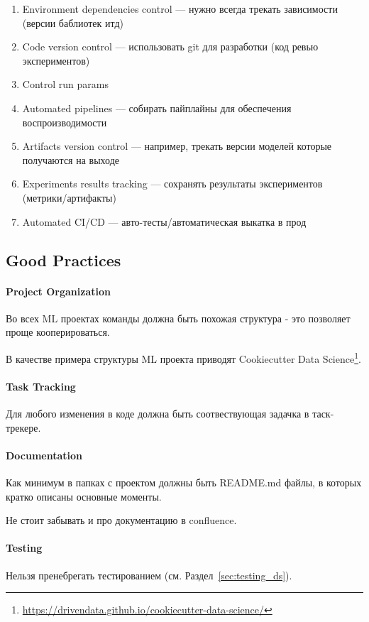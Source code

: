 \begin{enumerate}
    \item Environment dependencies control --- нужно всегда трекать зависимости (версии баблиотек итд)
    \item Code version control --- использовать git для разработки (код ревью экспериментов)
    \item Control run params
    \item Automated pipelines --- собирать пайплайны для обеспечения воспроизводимости
    \item Artifacts version control --- например, трекать версии моделей которые получаются на выходе
    \item Experiments results tracking --- сохранять результаты экспериментов (метрики/артифакты)
    \item Automated CI/CD --- авто-тесты/автоматическая выкатка в прод
\end{enumerate}

\subsection{Good Practices}

\paragraph{Project Organization} Во всех ML проектах команды должна быть похожая структура - это позволяет проще кооперироваться.

В качестве примера структуры ML проекта приводят Cookiecutter Data Science\footnote{\url{https://drivendata.github.io/cookiecutter-data-science/}}.

\paragraph{Task Tracking} Для любого изменения в коде должна быть соотвествующая задачка в таск-трекере.

\paragraph{Documentation} Как минимум в папках с проектом должны быть README.md файлы, в которых кратко описаны основные моменты.

Не стоит забывать и про документацию в confluence.

\paragraph{Testing} Нельзя пренебрегать тестированием (см. Раздел~\ref{sec:testing_ds}).

